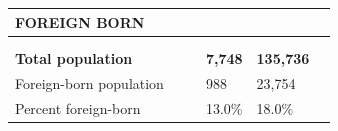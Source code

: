 \documentclass[9pt]{report}
\begin{document}
\newpage
\setlength{\tabcolsep}{.01in} %
\begin{tabular}{p{.10in}p{.10in}p{.10in}p{3.7in}>{\hfill}p{.85in}>{\hfill}p{.85in}>{\hfill}p{.85in}>{\hfill}p{.85in}p{0.1in}}
\multicolumn{9}{l}{\parbox{7.1in}{\raggedright{\large{\strut\textbf{FOREIGN BORN}\strut}}}} \\ 
\hline
\multicolumn{4}{l}{\parbox{3.5in}{\raggedright{\textbf{}}}} & \multicolumn{1}{r}{\parbox{.85in}{\strut\raggedleft{\textbf{}\strut}}} & \multicolumn{1}{r}{\parbox{.85in}{\strut\raggedleft{\textbf{}\strut}}} & \multicolumn{1}{r}{\parbox{.85in}{\strut{}}} & \multicolumn{1}{r}{\parbox{.85in}{\strut{}}} & \\ 
\multicolumn{9}{l}{} \\ 
\multicolumn{4}{l}{\parbox{3.5in}{\strut\raggedright{\textbf{Total population}\strut}}} & \textbf{} & \textbf{} & \textbf{7,748} & \textbf{135,736} & \textbf{} \\ 
\multicolumn{4}{l}{\parbox{3.6in}{\strut\raggedright{{Foreign-born population}}\strut}} &  &  & 988 & 23,754 & \multicolumn{1}{l}{}  \\ 
\multicolumn{4}{l}{\parbox{3.6in}{\strut\raggedright{{Percent foreign-born}}\strut}} &  &  & 13.0\% & 18.0\% & \multicolumn{1}{l}{}  \\ 

\end{tabular}
\setlength{\tabcolsep}{6pt} %
\end{document}
